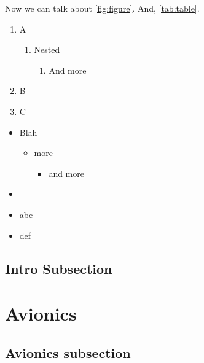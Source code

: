 \documentclass{article}
\begin{document}
    Now we can talk about \autoref{fig:figure}. And, \autoref{tab:table}. \autocite[2]{rocket-paper}
    
    \lipsum[10]
    \lipsum[10]

    \begin{enumerate}
        \item A
        \begin{enumerate}
            \item Nested
            \begin{enumerate}
                \item And more
            \end{enumerate}
        \end{enumerate}
        \item B
        \item C
    \end{enumerate}

    \begin{itemize}
        \item Blah
        \begin{itemize}
            \item more
            \begin{itemize}
                \item and more
            \end{itemize}
        \end{itemize}
        \item \lipsum[5]
        \item abc
        \item def
    \end{itemize}

    \subsection{Intro Subsection}
    \lipsum[10]
    \lipsum[10]
    \lipsum[10]

    \lipsum[10]
    \lipsum[10]
    \lipsum[10]

    \lipsum[10]
    \lipsum[10]

    \section{Avionics}
    \lipsum[10]

    \subsection{Avionics subsection}
    \lipsum[10]
\end{document}
